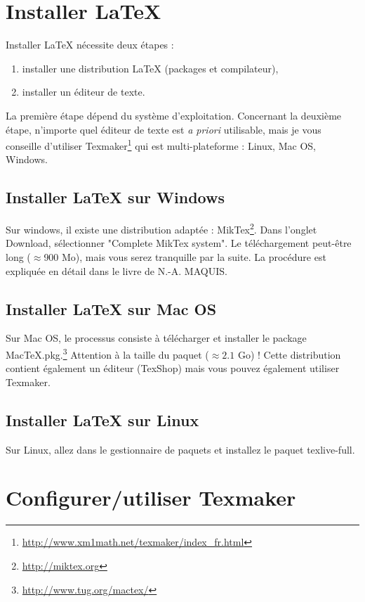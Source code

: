 \documentclass[a4paper,11pt]{report}
\begin{document}
\section{Installer \LaTeX}
Installer LaTeX nécessite deux étapes :
\begin{enumerate}
\item installer une distribution LaTeX (packages et compilateur),
\item installer un éditeur de texte.
\end{enumerate}
La première étape dépend du système d'exploitation. Concernant la deuxième étape, n'importe quel éditeur de texte est \textit{a priori} utilisable, mais je vous conseille d'utiliser Texmaker\footnote{\url{http://www.xm1math.net/texmaker/index_fr.html}}  qui est multi-plateforme : Linux, Mac OS, Windows.

\subsection{Installer LaTeX sur Windows}
Sur windows, il existe une distribution adaptée  : MikTex\footnote{\url{http://miktex.org}}. Dans l'onglet Download, sélectionner "Complete MikTex system". Le téléchargement peut-être long ($\approx$900 Mo), mais vous serez tranquille par la suite. La procédure est expliquée en détail dans le livre de N.-A. MAQUIS.\cite{maq}\\

\subsection{Installer LaTeX sur Mac OS}
Sur Mac OS, le processus consiste à télécharger et installer le package MacTeX.pkg.\footnote{\url{http://www.tug.org/mactex/}} Attention à la taille du paquet ($\approx 2.1$ Go) !
Cette distribution contient également un éditeur (TexShop) mais vous pouvez également utiliser Texmaker.

\subsection{Installer LaTeX sur Linux}
Sur Linux, allez dans le gestionnaire de paquets et installez le paquet texlive-full. 

\section{Configurer/utiliser Texmaker}
\end{document}
